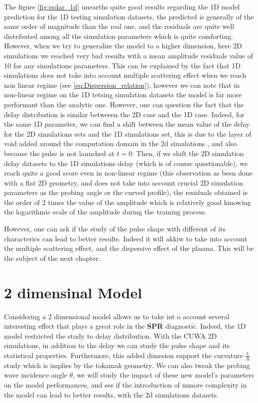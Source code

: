 \documentclass[11pt,a4paper,openany]{report}
\begin{document}
\begin{multicols}{2}
    The figure \ref{fig:polar_1d} unearths quite good results regarding the 1D model prediction for the 1D testing simulation datasets, the predicted is generally of the same order of magnitude than the real one, and the residuals are quite well distributed among all the simulation parameters which is quite comforting. However, when we try to generalize the model to a higher dimension, here 2D simulations we reached very bad results with a mean amplitude residuals value of 10 for any simulations parameters. This can be explained by the fact that 1D simulations does not take into account multiple scattering effect when we reach non linear regime (see \ref{eq:Dispersion_relation}), however we can note that in non-linear regime on the 1D tetsing simulation datasets the model is far more performant than the analytic one. However, one can question the fact that the delay distribution is similar betweeen the 2D case and the 1D case. Indeed, for the same 1D parameter, we can find a shift between the mean value of the delay for the 2D simulations sets and the 1D simulations set, this is due to the layer of void added around the computation domain in the 2d simulations \cite{SPR_Krutkin}, and also because the pulse is not launched at $t=0$. Then, if we shift the 2D simulation delay datasets to the 1D simulations delay (which is of course questionable), we reach quite a good score even in non-linear regime (this observation as been done with a flat 2D geometry, and does not take into account crucial 2D simulation parameters as the probing angle or the curved profile), the residuals obtained is the order of 2 times the value of the amplitude which is relatively good kmowing the logarithmic scale of the amplitude during the training process.

    However, one can ask if the study of the pulse shape with different of its characterics can lead to better results. Indeed it will akkiw to take into account the multiple scattering effect, and the dispersive effect of the plasma. This will be the subject of the next chapter.
    \chapter{2 dimensinal Model}
    Considering a 2 dimensional model allows us to take int o account several interesting effect that plays a great role in the \textbf{SPR} diagnostic. Indeed, the 1D model restricted the study to delay distribution. With the CUWA 2D simulations, in addition to the delay we can study the pulse shape and its statistical properties. Furthermore, this added dimesion support the curvature $\frac{1}{R}$ study which is implies by the tokamak geometry. We can also tweak the probing wave incidence angle $\theta$, we will study the impact of these new model's parameters on the model performances, and see if the introduction of mmore complexity in the model can lead to better results, with the 2d simulations datasets.

\end{multicols}
\end{document}
